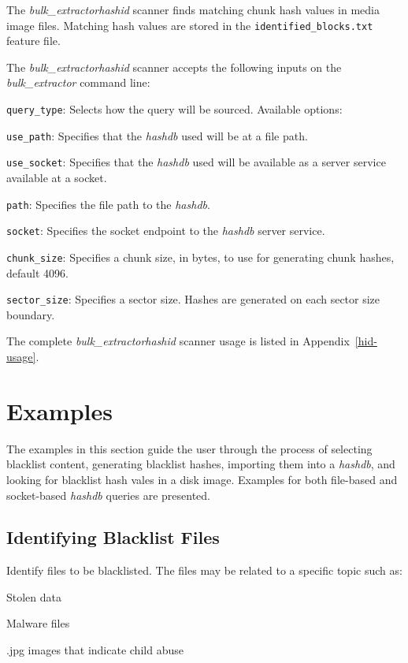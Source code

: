 \documentclass[11pt,twoside]{article}
\newcommand \bulk {\textit{bulk\_extractor}\xspace}
\newcommand \hdb {\textit{hashdb}\xspace}
\newcommand \hid {\textit{hashid}\xspace}
\begin{document}
The \bulk \hid scanner finds matching chunk hash values in media image files.
Matching hash values are stored in the \texttt{identified\_blocks.txt}
feature file.

The \bulk \hid scanner accepts the following inputs
on the \bulk command line:

\begin{compactitem}	
\item \texttt{query\_type}: Selects how the query will be sourced.
Available options:
\begin{compactitem}	
\item \texttt{use\_path}: Specifies that the \hdb used will be at a file path.
\item \texttt{use\_socket}: Specifies that the \hdb used will be
available as a server service available at a socket.
\end{compactitem}	
\item \texttt{path}: Specifies the file path to the \hdb.
\item \texttt{socket}: Specifies the socket endpoint to the \hdb server service.
\item \texttt{chunk\_size}: Specifies a chunk size, in bytes,
to use for generating chunk hashes, default 4096.
\item \texttt{sector\_size}: Specifies a sector size.
Hashes are generated on each sector size boundary.
\end{compactitem}

The complete \bulk \hid scanner usage is listed in Appendix~\ref{hid-usage}.

\section{Examples}
The examples in this section guide the user through the process
of selecting blacklist content,
generating blacklist hashes,
importing them into a \hdb,
and looking for blacklist hash vales in a disk image.
Examples for both file-based and socket-based \hdb queries are presented.

\subsection{Identifying Blacklist Files}
Identify files to be blacklisted.
The files may be related to a specific topic such as:
\begin{compactitem}	
\item Stolen data
\item Malware files
\item .jpg images that indicate child abuse
\end{compactitem}	
\end{document}
